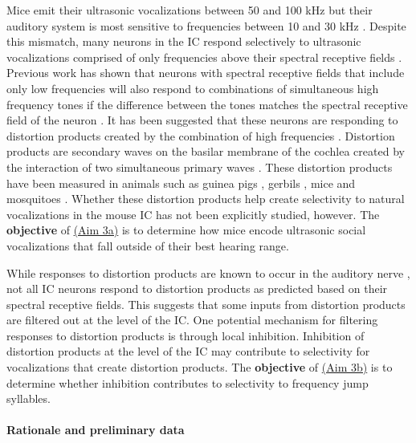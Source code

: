 \documentclass[12pt]{article}
\begin{document}
Mice emit their ultrasonic vocalizations between 50 and 100 kHz \cite{nyby1976social, Nyby83, portforstypes2007} but their auditory system is most sensitive to frequencies between 10 and 30 kHz \cite{ehretfrequency1975}. Despite this mismatch, many neurons in the IC respond selectively to ultrasonic vocalizations comprised of only frequencies above their spectral receptive fields \cite{portforsover-representation2009, holmstromefficient2010}. Previous work has shown that neurons with spectral receptive fields that include only low frequencies will also respond to combinations of simultaneous high frequency tones if the difference between the tones matches the spectral receptive field of the neuron \cite{portforsover-representation2009, mcalpineneural2004}. It has been suggested that these neurons are responding to distortion products created by the combination of high frequencies \cite{portforsover-representation2009}. Distortion products are secondary waves on the basilar membrane of the cochlea created by the interaction of two simultaneous primary waves \cite{roblestwo-tone1991, coopermechanical1997}. These distortion products have been measured in animals such as guinea pigs \cite{mcalpineneural2004}, gerbils \cite{abelsensitive2009}, mice \cite{portforsover-representation2009} and mosquitoes \cite{pennetiersinging2010}. Whether these distortion products help create selectivity to natural vocalizations in the mouse IC has not been explicitly studied, however. The \textbf{objective} of \underline{(Aim 3a)} is to determine how mice encode ultrasonic social vocalizations that fall outside of their best hearing range. 

While responses to distortion products are known to occur in the auditory nerve \cite{goldsteinneural1968}, not all IC neurons respond to distortion products as predicted based on their spectral receptive fields. This suggests that some inputs from distortion products are filtered out at the level of the IC. One potential mechanism for filtering responses to distortion products is through local inhibition. Inhibition of distortion products at the level of the IC may contribute to selectivity for vocalizations that create distortion products. The \textbf{objective} of \underline{(Aim 3b)} is to determine whether inhibition contributes to selectivity to frequency jump syllables. 

\paragraph{Rationale and preliminary data}
\end{document}

